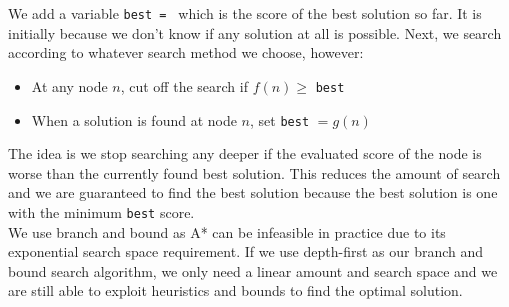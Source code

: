 \documentclass{article}
\newcommand{\n}[0]{\\[\baselineskip]}
\begin{document}
\noindent
We add a variable \texttt{best = \infty} which is the score of the best solution so far. It is \infty initially because we don't know if any solution at all is possible. Next, we search according to whatever search method we choose, however:
\begin{itemize}
\item At any node $n$, cut off the search if $f(n) \geq $ \texttt{best}
\item When a solution is found at node $n$, set \texttt{best} $ = g(n)$
\end{itemize}
The idea is we stop searching any deeper if the evaluated score of the node is worse than the currently found best solution. This reduces the amount of search and we are guaranteed to find the best solution because the best solution is one with the minimum \texttt{best} score.
\n
We use branch and bound as A* can be infeasible in practice due to its exponential search space requirement. If we use depth-first as our branch and bound search algorithm, we only need a linear amount and search space and we are still able to exploit heuristics and bounds to find the optimal solution. 
\end{document}
